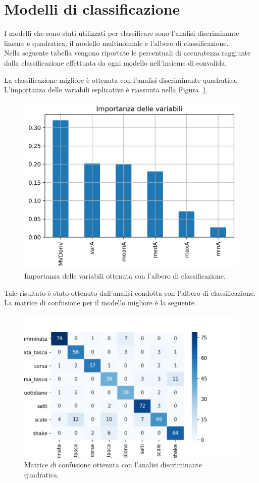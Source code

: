 \documentclass[main.tex]{subfiles}
\begin{document}
\section{Modelli di classificazione}
I modelli che sono stati utilizzati per classificare sono l'analisi discriminante lineare e quadratica, il modello multinomiale e l'albero di classificazione.
\\
Nella seguente tabella vengono riportate le percentuali di accuratezza raggiunte dalla classificazione effettuata da ogni modello nell'insieme di convalida.


La classificazione migliore è ottenuta con l'analisi discriminante quadratica. L'importanza delle variabili esplicative è riassunta nella Figura~\ref{fig:importance-Tree}.
\begin{figure}[H]
	\centering
	\includegraphics[width=.8\textwidth]{../../figure/importance-Tree.png}
	\caption{Importanza delle variabili ottenuta con l'albero di classificazione.}
	\label{fig:importance-Tree}
\end{figure}
Tale risultato è stato ottenuto dall'analisi condotta con l'albero di classificazione.
\\
La matrice di confusione per il modello migliore è la seguente.
\begin{figure}[H]
	\centering
	\includegraphics[width=.8\textwidth]{../../figure/confusionMatrix-QDA.png}
	\caption{Matrice di confusione ottenuta con l'analisi discriminante quadratica.}
	\label{fig:qda}
\end{figure}
\end{document}
